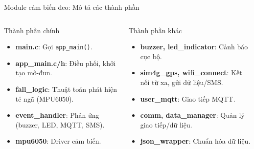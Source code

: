 \begin{frame}{Module cảm biến đeo: Mô tả các thành phần}
    \begin{columns}[t]
        \begin{column}{0.48\textwidth}
            \begin{block}{Thành phần chính}
                \begin{itemize}
                    \item \textbf{main.c}: Gọi \texttt{app\_main()}.
                    \item \textbf{app\_main.c/h}: Điều phối, khởi tạo mô-đun.
                    \item \textbf{fall\_logic}: Thuật toán phát hiện té ngã (MPU6050).
                    \item \textbf{event\_handler}: Phản ứng (buzzer, LED, MQTT, SMS).
                    \item \textbf{mpu6050}: Driver cảm biến.
                \end{itemize}
            \end{block}
        \end{column}
        \begin{column}{0.48\textwidth}
            \begin{block}{Thành phần khác}
                \begin{itemize}
                    \item \textbf{buzzer, led\_indicator}: Cảnh báo cục bộ.
                    \item \textbf{sim4g\_gps, wifi\_connect}: Kết nối từ xa, gửi dữ liệu/SMS.
                    \item \textbf{user_mqtt}: Giao tiếp MQTT.
                    \item \textbf{comm, data\_manager}: Quản lý giao tiếp/dữ liệu.
                    \item \textbf{json\_wrapper}: Chuẩn hóa dữ liệu.
                \end{itemize}
            \end{block}
        \end{column}
    \end{columns}
\end{frame}

